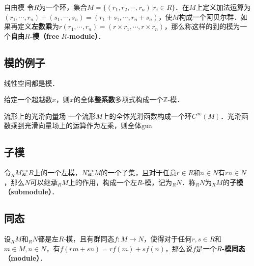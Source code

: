 \begin{definition}{自由模}
令$R$为一个环，集合$M=\{(r_1, r_2, \cdots, r_n)|r_i\in R\}$．在$M$上定义加法运算为$(r_1, \cdots, r_n)+(s_1, \cdots, s_n)=(r_1+s_1, \cdots, r_n+s_n)$，使$M$构成一个阿贝尔群．如果再定义\textbf{左数乘}为$r(r_1, \cdots, r_n)=(r\times r_1, \cdots, r\times r_n)$，那么称这样的到的模为一个\textbf{自由}$R$\textbf{-模（free} $R$\textbf{-module）}．
\end{definition}





\subsection{模的例子}

\begin{example}{}
线性空间都是模．
\end{example}

\begin{example}{}
给定一个超越数$x$，则$x$的全体\textbf{整系数}多项式构成一个$\mathbb{Z}$-模．
\end{example}

\begin{definition}{流形上的光滑向量场}
一个流形$M$上的全体光滑函数构成一个环$C^{\infty}(M)$．光滑函数乘到光滑向量场上的运算作为左乘，则全体gua
\end{definition}


\subsection{子模}

令$_RM$是$R$上的一个左模，$N$是$M$的一个子集，且对于任意$r\in R$和$n\in N$有$rn\in N$，那么$N$可以继承$_RM$上的作用，构成一个左$R$-模，记为$_RN$．称$_RN$为$_RM$的\textbf{子模（submodule）}．


\subsection{同态}

设$_RM$和$_RN$都是左$R$-模，且有群同态$f:M\to N$，使得对于任何$r, s\in R$和$m\in M, n\in N$，有$f(rm+sn)=rf(m)+sf(n)$，那么说$f$是一个$R$\textbf{-模同态（module）}．











